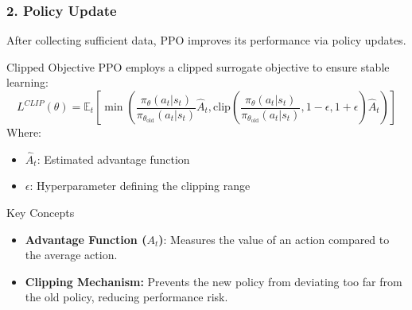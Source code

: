 \documentclass{beamer}
\begin{document}
\begin{frame}[fragile]
    \frametitle{2. Policy Update}
    After collecting sufficient data, PPO improves its performance via policy updates.
    
    \begin{block}{Clipped Objective}
        PPO employs a clipped surrogate objective to ensure stable learning:
        \begin{equation}
            L^{CLIP}(\theta) = \mathbb{E}_t \left[ \min\left(\frac{\pi_\theta(a_t|s_t)}{\pi_{\theta_{\text{old}}}(a_t|s_t)} \hat{A}_t, \text{clip}\left(\frac{\pi_\theta(a_t|s_t)}{\pi_{\theta_{\text{old}}}(a_t|s_t)}, 1-\epsilon, 1+\epsilon\right) \hat{A}_t\right) \right]
        \end{equation}
        Where:
        \begin{itemize}
            \item $\hat{A}_t$: Estimated advantage function
            \item $\epsilon$: Hyperparameter defining the clipping range
        \end{itemize}
    \end{block}
    
    \begin{block}{Key Concepts}
        \begin{itemize}
            \item \textbf{Advantage Function ($A_t$)}: Measures the value of an action compared to the average action.
            \item \textbf{Clipping Mechanism:} Prevents the new policy from deviating too far from the old policy, reducing performance risk.
        \end{itemize}
    \end{block}
\end{frame}
\end{document}
